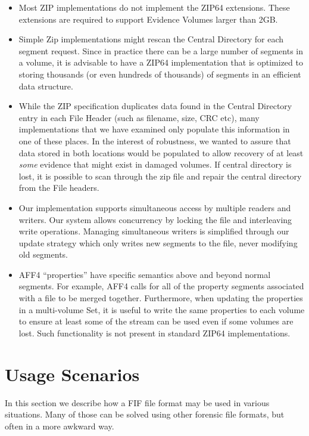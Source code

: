 \documentclass[10pt, conference]{IEEEtran}
\begin{document}
\begin{itemize}
\item Most ZIP implementations do not implement the ZIP64
  extensions. These extensions are required to support Evidence
  Volumes larger than 2GB.
\item Simple Zip implementations might rescan the
Central Directory for each segment request. Since in practice there
can be a large number of segments in a volume, it is advisable to have
a ZIP64 implementation that is optimized to storing thousands (or even
hundreds of thousands) of segments in an efficient data structure. 
\item While the ZIP specification duplicates data found in the Central
  Directory entry in each File Header (such as filename, size, CRC
  etc), many implementations that we have examined only populate this
  information in one of these places. In the interest of robustness,
  we wanted to assure that data stored in both locations would be
  populated to allow recovery of at least \emph{some} evidence that
  might exist in damaged volumes. If central directory is lost, it is
  possible to scan through the zip file and repair the central
  directory from the File headers.

\item Our implementation supports simultaneous access by multiple
  readers and writers. Our system allows concurrency by locking the
  file and interleaving write operations. Managing simultaneous
  writers is simplified through our update strategy which only writes
  new segments to the file, never modifying old segments. 

\item AFF4 ``properties'' have specific semantics above and beyond
  normal segments. For example, AFF4 calls for all of the property
  segments associated with a file to be merged together. Furthermore,
  when updating the properties in a multi-volume Set, it is useful to
  write the same properties to each volume to ensure at least some of
the stream can be used even if some volumes are lost. Such
functionality is not present in standard ZIP64 implementations.
\end{itemize}

\section{Usage Scenarios}
In this section we describe how a FIF file format may be used in
various situations. Many of those can be solved using other forensic
file formats, but often in a more awkward way.
\end{document}
